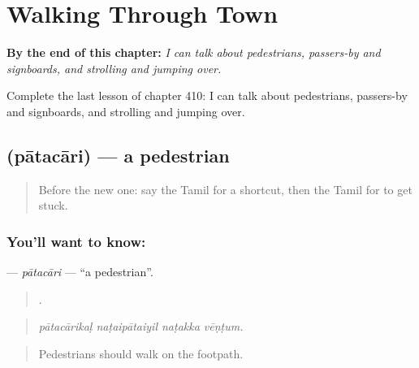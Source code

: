 
\chapter{Walking Through Town}
\label{ch:ta-walking-through-town}

\begin{chapteropening}
\textbf{By the end of this chapter:} \emph{I can talk about pedestrians, passers-by and signboards, and strolling and jumping over.}

Complete the last lesson of chapter 410: I can talk about pedestrians, passers-by and signboards, and strolling and jumping over.
\end{chapteropening}

\section[\texorpdfstring{\ta{பாதசாரி} (pātacāri)}{பாதசாரி (pātacāri)}]{ (pātacāri) — a pedestrian}

\label{lesson:TA-C410-patacari}



\begin{quote}
Before the new one: say the Tamil for a shortcut, then the Tamil for to get stuck.
\end{quote}

\subsection*{You'll want to know: }
\textbf{} — \emph{pātacāri} — \textquotedblleft{}a pedestrian\textquotedblright{}.

\begin{quote}
   .
\end{quote}

\begin{quote}
\emph{pātacārikaḷ naṭaipātaiyil naṭakka vēṇṭum.}
\end{quote}

\begin{quote}
Pedestrians should walk on the footpath.
\end{quote}

